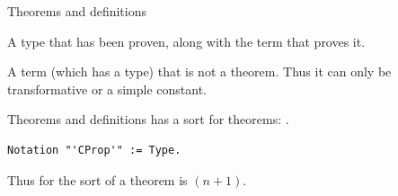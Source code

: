 \begin{frame}{Theorems and definitions}
	\begin{definition}[Theorem]
		A type that has been proven, along with the term that proves it.
	\end{definition}
	\bigskip
	\begin{definition}[Definition]
		A term (which has a type) that is not a theorem.
		Thus it can only be transformative or a simple constant.
	\end{definition}
\end{frame}

\begin{frame}[fragile]{Theorems and definitions}
	\coq has a sort for theorems: \sortprop.
	\pause
	\bigskip
\begin{lstlisting}[language=Coq, mathescape]
Notation "'CProp'" := Type.
\end{lstlisting}
	\bigskip
	Thus for \corn the sort of a theorem is \sorttype{}$(n+1)$.
\end{frame}


